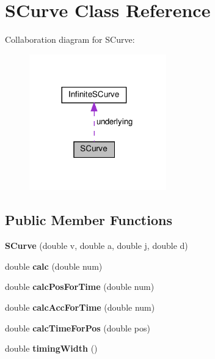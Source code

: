 \hypertarget{classSCurve}{}\section{S\+Curve Class Reference}
\label{classSCurve}


Collaboration diagram for S\+Curve\+:\nopagebreak
\begin{figure}[H]
\begin{center}
\leavevmode
\includegraphics[width=168pt]{classSCurve__coll__graph}
\end{center}
\end{figure}
\subsection*{Public Member Functions}
\begin{DoxyCompactItemize}
\item 
\mbox{\label{classSCurve_a3e399a2be395460823476a4f2d881fff}} 
{\bfseries S\+Curve} (double v, double a, double j, double d)
\item 
\mbox{\label{classSCurve_a34f5a1a56854e9297fddfa07c422e974}} 
double {\bfseries calc} (double num)
\item 
\mbox{\label{classSCurve_a332bc29667ae14b150d16388027cff9a}} 
double {\bfseries calc\+Pos\+For\+Time} (double num)
\item 
\mbox{\label{classSCurve_a167555657b6d99e26c3538a715a14de6}} 
double {\bfseries calc\+Acc\+For\+Time} (double num)
\item 
\mbox{\label{classSCurve_aad5d2c65fbee40f77d28529854c05e88}} 
double {\bfseries calc\+Time\+For\+Pos} (double pos)
\item 
\mbox{\label{classSCurve_ac1b45b15d7d29a863de7d11583ed3afb}} 
double {\bfseries timing\+Width} ()
\end{DoxyCompactItemize}
